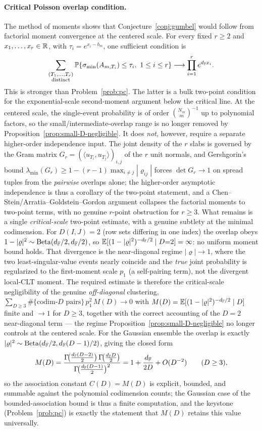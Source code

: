 \paragraph{Critical Poisson overlap condition.}
The method of moments shows that Conjecture~\ref{conj:gumbel} would follow from
factorial moment convergence at the centered scale.  For every fixed
\(r\ge2\) and \(x_1,\ldots,x_r\in\mathbb{R}\), with
\(\tau_i=e^{x_i-b_m}\), one sufficient condition is
\[
  \sum_{\substack{(T_1,\ldots,T_r)\\\text{distinct}}}
  \mathbb{P}\{\sigma_{\min}(A_{m,T_i})\le\tau_i,\ 1\le i\le r\}
  \longrightarrow
  \prod_{i=1}^r e^{d_{\mathbb{F}} x_i}.
\]
This is stronger than Problem~\ref{prob:pc}.  The latter is a bulk two-point
condition for the exponential-scale second-moment argument below the critical
line.  At the centered scale, the single-event probability is of order
\(\binom{N_m}{m}^{-1}\) up to polynomial factors, so the
small/intermediate-overlap range is no longer removed by
Proposition~\ref{prop:small-D-negligible}.  It does \emph{not}, however, require a
separate higher-order independence input.  The joint density of the \(r\) slabs is
governed by the Gram matrix \(G_r=(\langle u_{T_i},u_{T_j}\rangle)_{i,j}\) of the
\(r\) unit normals, and Gershgorin's bound
\(\lambda_{\min}(G_r)\ge 1-(r-1)\max_{i\ne j}|\varrho_{ij}|\) forces
\(\det G_r\to1\) on spread tuples from the \emph{pairwise} overlaps alone; the
higher-order asymptotic independence is thus a corollary of the two-point
statement, and a Chen--Stein/Arratia--Goldstein--Gordon argument collapses the
factorial moments to two-point terms, with no genuine \(r\)-point obstruction for
\(r\ge3\).  What remains is a single \emph{critical-scale} two-point estimate, with
a genuine subtlety at the minimal codimension.  For \(D(I,J)=2\) (row sets
differing in one index) the overlap obeys \(1-|\varrho|^2\sim\mathrm{Beta}(d_{\mathbb{F}}/2,d_{\mathbb{F}}/2)\),
so \(\mathbb{E}[(1-|\varrho|^2)^{-d_{\mathbb{F}}/2}\mid D{=}2]=\infty\): no uniform moment bound
holds.  That divergence is the near-diagonal regime \(|\varrho|\to1\), where the two
least-singular-value events nearly coincide and the \emph{true} joint probability
is regularized to the first-moment scale \(p_1\) (a self-pairing term), not the
divergent local-CLT moment.  The required estimate is therefore the critical-scale
negligibility of the genuine \emph{off-diagonal} clustering,
\(\sum_{D\ge3}\#\{\text{codim-}D\text{ pairs}\}\,p_1^2\,M(D)\to0\) with
\(M(D)=\mathbb{E}[(1-|\varrho|^2)^{-d_{\mathbb{F}}/2}\mid D]\) finite and \(\to1\) for \(D\ge3\),
together with the correct accounting of the \(D=2\) near-diagonal term --- the
regime Proposition~\ref{prop:small-D-negligible} no longer controls at the centered
scale.  For the Gaussian ensemble the overlap is exactly
\(|\varrho|^2\sim\operatorname{Beta}(d_{\mathbb{F}}/2,d_{\mathbb{F}}(D-1)/2)\), giving the closed form
\[
  M(D)=\frac{\Gamma\!\big(\tfrac{d_{\mathbb{F}}(D-2)}2\big)\,\Gamma\!\big(\tfrac{d_{\mathbb{F}} D}2\big)}
            {\Gamma\!\big(\tfrac{d_{\mathbb{F}}(D-1)}2\big)^2}
       =1+\frac{d_{\mathbb{F}}}{2D}+O(D^{-2})\qquad(D\ge3),
\]
so the association constant \(C(D)=M(D)\) is explicit, bounded, and summable against
the polynomial codimension counts; the Gaussian case of the bounded-association bound
is thus a finite computation, and the keystone (Problem~\ref{prob:pc}) is exactly the
statement that \(M(D)\) retains this value universally.

